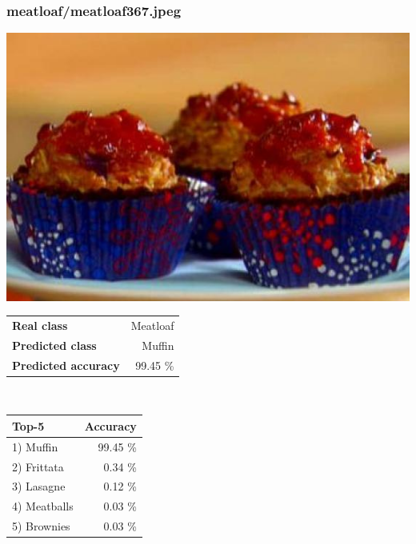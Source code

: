 \subsubsection{meatloaf/meatloaf367.jpeg}

\begin{minipage}[t]{0.4\textwidth}
	\vspace{0pt}
	\includegraphics[width=\linewidth]{images/evaluation-images/meatloaf/meatloaf367.jpeg}
\end{minipage}
\hfill
\begin{minipage}[t]{0.5\textwidth}
	\vspace{0pt}\raggedright
	\begin{tabularx}{\textwidth}{X r}
		\small \textbf{Real class} & \small Meatloaf\\
		\small \textbf{Predicted class} & \small Muffin\\
		\small \textbf{Predicted accuracy} & \small 99.45 \%
    \end{tabularx}\\
    
    \vspace{6pt}
	\begin{tabularx}{\textwidth}{X r}
        \small \textbf{Top-5} & \small \textbf{Accuracy} \\
        \hline
		\small 1) Muffin & \small 99.45 \%\\\small 2) Frittata & \small 0.34 \%\\\small 3) Lasagne & \small 0.12 \%\\\small 4) Meatballs & \small 0.03 \%\\\small 5) Brownies & \small 0.03 \%
    \end{tabularx}
\end{minipage}
    
